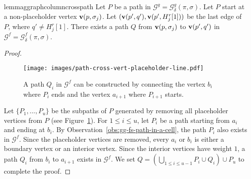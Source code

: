 \documentclass[thm-restate]{lipics-v2021}
\theoremstyle{remark}
\newcommand{\graph}[0]{\mathcal{G}}
\newcommand{\vertex}[1]{\normalfont \textbf{v}(#1)}
\newcommand{\fsgraph}[0]{\graph^{f}}
\newcommand{\ggraph}[0]{\graph^g}
\begin{document}
\begin{restatable}{lemma}{ggraphcolumncrosspath} \label{lem:ggraph-column-cross-path}
    Let $P$ be a path in $\ggraph = \ggraph_{\delta}(\pi, \sigma)$. Let $P$ start at a non-placeholder vertex $\vertex{p, \sigma_j}$. Let $(\vertex{p', q'}, \vertex{p', H^r_j[1]})$ be the last edge of $P$, where $q' \neq H^r_j[1]$. There exists a path $Q$ from $\vertex{p, \sigma_j}$ to $\vertex{p', q'}$ in $\fsgraph = \fsgraph_{\delta}(\pi, \sigma)$.  
\end{restatable}
\begin{proof}
    \begin{figure}[tbh]
        \centering
        \texttt{[image: images/path-cross-vert-placeholder-line.pdf]}
        \caption{A path $Q_i$ in $\fsgraph$ can be constructed by connecting the vertex $b_i$ where $P_i$ ends and the vertex $a_{i + 1}$ where $P_{i + 1}$ starts.}
        \label{fig:path-cross-vert-placeholder-line}
    \end{figure}

    Let $\{P_1, ..., P_u\}$ be the subpaths of $P$ generated by removing all placeholder vertices from $P$ (see Figure~\ref{fig:path-cross-vert-placeholder-line}). For $1 \leq i \leq u$, let $P_i$ be a path starting from $a_i$ and ending at $b_i$. By Observation~\ref{obs:gg-fs-path-in-a-cell}, the path $P_i$ also exists in $\fsgraph$. Since the placeholder vertices are removed, every $a_i$ or $b_i$ is either a boundary vertex or an interior vertex. Since the interior vertices have weight $1$, a path $Q_i$ from $b_i$ to $a_{i + 1}$ exists in $\fsgraph$. We set  $Q = (\bigcup_{1 \leq i \leq u - 1} P_i \cup Q_i) \cup P_u$ to complete the proof. 
\end{proof}
\end{document}
